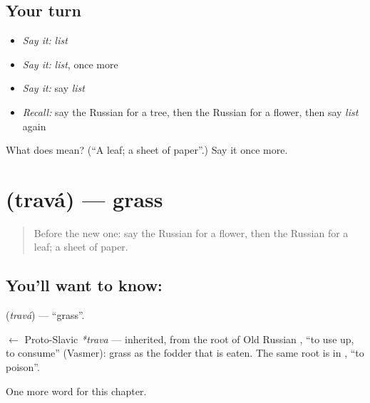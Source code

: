 \subsection*{Your turn}
\begin{itemize}
\raggedright
  \item \emph{Say it:} \emph{list}
  \item \emph{Say it:} \emph{list}, once more
  \item \emph{Say it:} say \emph{list}
  \item \emph{Recall:} say the Russian for a tree, then the Russian for a flower, then say \emph{list} again
\end{itemize}

\begin{tcolorbox}[breakable,colback=teal!4,colframe=teal!35!black,title={Before you move on}]
What does  mean? (\textquotedblleft{}A leaf; a sheet of paper\textquotedblright{}.) Say it once more.
\end{tcolorbox}
\section[\texorpdfstring{\ru{трава} (travá)}{трава (travá)}]{ (travá) — grass}

\label{lesson:RU-C55-grass}



\begin{quote}
Before the new one: say the Russian for a flower, then the Russian for a leaf; a sheet of paper.
\end{quote}

\subsection*{You'll want to know: }
\textbf{} (\emph{travá}) — \textquotedblleft{}grass\textquotedblright{}.

\begin{cousinweb}
\textbf{} $\leftarrow$ Proto-Slavic \emph{*trava} — inherited, from the root of Old Russian \emph{}, \textquotedblleft{}to use up, to consume\textquotedblright{} (Vasmer): grass as the fodder that is eaten. The same root is in \emph{}, \textquotedblleft{}to poison\textquotedblright{}.
\end{cousinweb}

\begin{grammarlens}[title={What you've built}]
One more word for this chapter.
\end{grammarlens}

